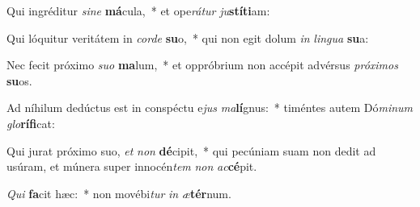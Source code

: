 \item Qui ingréditur \textit{sine} \textbf{má}cula,~* et ope\tinyhspace\textit{rátur} \textit{ju}\textbf{stíti}am:
\item Qui lóquitur veritátem in \textit{corde} \textbf{su}o,~* qui non egit dolum \textit{in} \textit{lingua} \textbf{su}a:
\item Nec fecit próximo \textit{suo} \textbf{ma}lum,~* et oppróbrium non accépit advérsus \textit{próximos} \textbf{su}os.
\item Ad níhilum dedúctus est in conspéctu e\textit{jus} \textit{ma}\textbf{lí}gnus:~* timéntes autem Dó\textit{minum} \textit{glo}\textbf{rífi}cat:
\item Qui jurat próximo suo, \textit{et} \textit{non} \textbf{dé}cipit,~* qui pecúniam suam non dedit ad usúram, et múnera super innocén\textit{tem} \textit{non} \textit{ac}\textbf{cé}pit.
\item \textit{Qui} \textbf{fa}cit hæc:~* non movébi\textit{tur} \textit{in} \textit{æ}\textbf{tér}num.
